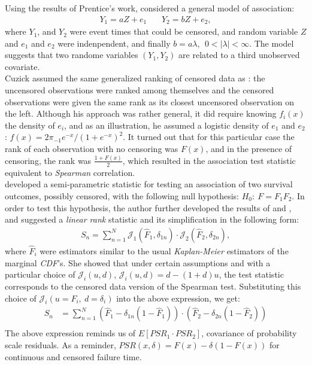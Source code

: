 \documentclass[]{article}
\begin{document}
Using the results of Prentice's work, \cite{cuzick1982rank} considered a general model of association:
	$$
	\begin{aligned}
		Y_1 = aZ + e_1 ~~~~~~~~ Y_2 = bZ + e_2,
	\end{aligned}
	$$
where $Y_1$, and $Y_2$ were event times that could be censored, and random variable $Z$ and $e_1$ and $e_2$ were indenpendent, and finally $b=a\lambda,~~0<|\lambda|<\infty$. The model suggests that two randome variables $(Y_1, Y_2)$ are related to a third unobserved covariate.\\
Cuzick assumed the same generalized ranking of censored data as \cite{prentice1978linear}: the uncensored observations were ranked among themselves and the censored observations were given the same rank as its closest uncensored observation on the left. Although his approach was rather general, it did require knowing $f_i(x)$ the density of $e_i$, and as an illustration, he assumed a logistic density of $e_1$ and $e_2$:  $f(x) = 2\pi_{-1} e^{-x}/(1+e^{-x})^2$. It turned out that for this particular case the rank of each observation with no censoring was $F(x)$, and in the presence of censoring, the rank was $\frac{1+F(x)}{2}$, which resulted in the association test statistic equivalent to \emph{Spearman} correlation.\\

\cite{dabrowska1986rank} developed a semi-parametric statistic for testing an association of two survival outcomes, possibly censored, with the following null hypothesis: $H_0:~F=F_1 F_2$. In order to test this hypothesis, the author further developed the results of \cite{prentice1978linear} and \cite{cuzick1982rank} , and suggested a \emph{linear rank} statistic and its simplification in the following form:
	$$
	\begin{aligned}
		 S_n = \sum_{n=1}^N \mathcal{J}_1( \hat{F}_1, \delta_{1n}) \cdot \mathcal{J}_2( \hat{F}_2, \delta_{2n}),
	\end{aligned}
	$$
where $\hat{F}_i$ were estimators similar to the usual \emph{Kaplan-Meier} estimators of the marginal \emph{CDF}'s. She showed that under certain assumptions and with a particular choice of $\mathcal{J}_i(u,d)$, $\mathcal{J}_i(u,d) =d-(1+d)u$, the test statistic corresponds to the censored data version of the Spearman test. Substituting this choice of $\mathcal{J}_i(u=F_i,~d=\delta_i)$ into the above expression, we get:
	$$
	\begin{aligned}
		 S_n &= \sum_{n=1}^N (\hat{F}_1 - \delta_{1n}(1-\hat{F}_1))\cdot (\hat{F}_2 - \delta_{2n}(1-\hat{F}_2))\\
	\end{aligned}
	$$
The above expression reminds us of $E[PSR_1 \cdot PSR_2]$, covariance of probability scale residuals. As a reminder, $PSR(x, \delta) = F(x)-\delta(1-F(x))$ for continuous and censored failure time.\\
\end{document}
